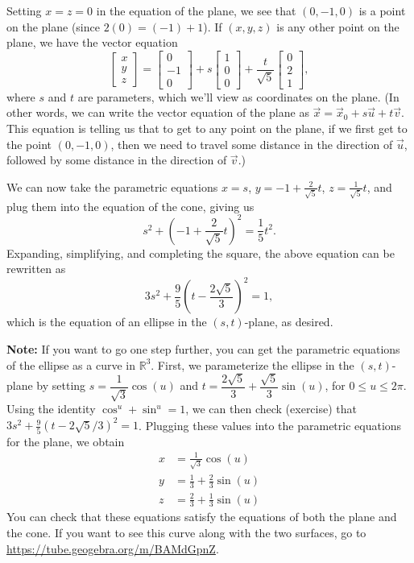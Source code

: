 \documentclass[letterpaper,12pt]{article}
\newcommand{\R}{\mathbb{R}}
\newcommand{\bbm}{\begin{bmatrix}}
\newcommand{\ebm}{\end{bmatrix}}
\begin{document}
\begin{enumerate}
Setting $x=z=0$ in the equation of the plane, we see that $(0,-1,0)$ is a point on the plane (since $2(0)=(-1)+1$). If $(x,y,z)$ is any other point on the plane, we have the vector equation
\[
 \bbm x\\y\\z\ebm = \bbm 0\\-1\\0\ebm + s\bbm 1\\0\\0\ebm + \frac{t}{\sqrt{5}}\bbm 0\\2\\1\ebm,
\]
where $s$ and $t$ are parameters, which we'll view as coordinates on the plane. (In other words, we can write the vector equation of the plane as $\vec{x} = \vec{x}_0 + s\vec{u}+t\vec{v}$. This equation is telling us that to get to any point on the plane, if we first get to the point $(0,-1,0)$, then we need to travel some distance in the direction of $\vec{u}$, followed by some distance in the direction of $\vec{v}$.)

We can now take the parametric equations $x=s$, $y=-1+\frac{2}{\sqrt{5}}t$, $z=\frac{1}{\sqrt{5}}t$, and plug them into the equation of the cone, giving us
\[
 s^2+\left(-1+\frac{2}{\sqrt{5}}t\right)^2 = \frac{1}{5}t^2.
\]
Expanding, simplifying, and completing the square, the above equation can be rewritten as
\[
 3s^2+\frac{9}{5}\left(t-\frac{2\sqrt{5}}{3}\right)^2=1,
\]
which is the equation of an ellipse in the $(s,t)$-plane, as desired.

{\bf Note:} If you want to go one step further, you can get the parametric equations of the ellipse as a curve in $\R^3$. First, we parameterize the ellipse in the $(s,t)$-plane by setting $s=\dfrac{1}{\sqrt{3}}\cos(u)$ and $t = \dfrac{2\sqrt{5}}{3}+\dfrac{\sqrt{5}}{3}\sin(u)$, for $0\leq u\leq 2\pi$. Using the identity $\cos^u+\sin^u=1$, we can then check (exercise) that $3s^2+\frac{9}{5}(t-2\sqrt{5}/3)^2=1$. Plugging these values into the parametric equations for the plane, we obtain
\begin{align*}
 x &= \frac{1}{\sqrt{3}}\cos(u)\\
 y &= \frac{1}{3}+\frac{2}{3}\sin(u)\\
 z &= \frac{2}{3}+\frac{1}{3}\sin(u)
\end{align*}
You can check that these equations satisfy the equations of both the plane and the cone. If you want to see this curve along with the two surfaces, go to\\ \href{https://tube.geogebra.org/m/BAMdGpnZ}{https://tube.geogebra.org/m/BAMdGpnZ}.


\end{enumerate}
\end{document}
